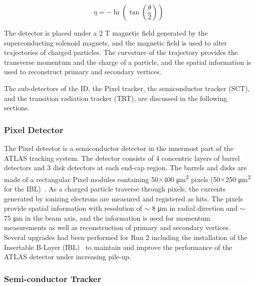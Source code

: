 \begin{equation}
    \label{eq:eta}
    \eta = -\ln (\tan (\frac{\theta}{2}))
\end{equation}

The detector is placed under a 2 T magnetic field generated by the superconducting solenoid magnets, and the magnetic field is used to alter trajectories of charged particles. The curvature of the trajectory provides the transverse momentum and the charge of a particle, and the spatial information is used to reconstruct primary and secondary vertices.

The sub-detectors of the ID, the Pixel tracker, the semiconductor tracker (SCT), and the transition radiation tracker (TRT), are discussed in the following sections.

\subsubsection{Pixel Detector}
\label{sec:atlas:pixel}

The Pixel detector is a semiconductor detector in the innermost part of the ATLAS tracking system. The detector consists of 4 concentric layers of barrel detectors and 3 disk detectors at each end-cap region. The barrels and disks are made of a rectangular Pixel modules containing 50$\times$400 \si{\micro\meter^{2}} pixels (50$\times$250 \si{\micro\meter^{2}} for the IBL)~\cite{1748-0221-10-06-C06012}. As a charged particle traverse through pixels, the currents generated by ionizing electrons are measured and registered as hits. The pixels provide spatial information with resolution of $\sim$ 8 \si{\micro\meter} in radial direction and $\sim$ 75 \si{\micro\meter} in the beam axis, and the information is used for momentum measurements as well as reconstruction of primary and secondary vertices. Several upgrades had been performed for Run 2 including the installation of the Insertable B-Layer (IBL)~\cite{2011NIMPA.650...45H} to maintain and improve the performance of the ATLAS detector under increasing pile-up.

\subsubsection{Semi-conductor Tracker}
\label{sec:atlas:sct}

